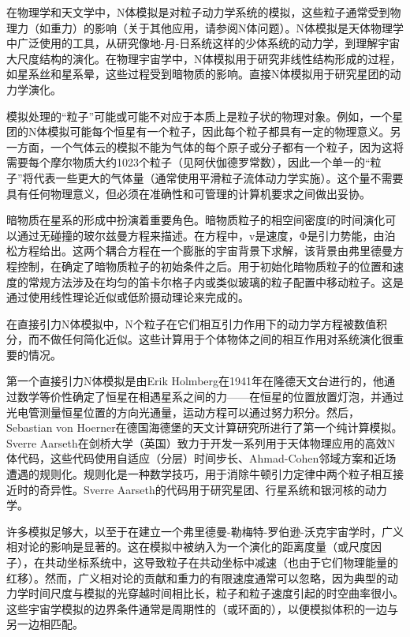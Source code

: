 
\begin{issues}
\issueDraft
\end{issues}


在物理学和天文学中，N体模拟是对粒子动力学系统的模拟，这些粒子通常受到物理力（如重力）的影响（关于其他应用，请参阅N体问题）。N体模拟是天体物理学中广泛使用的工具，从研究像地-月-日系统这样的少体系统的动力学，到理解宇宙大尺度结构的演化。在物理宇宙学中，N体模拟用于研究非线性结构形成的过程，如星系丝和星系晕，这些过程受到暗物质的影响。直接N体模拟用于研究星团的动力学演化。

模拟处理的“粒子”可能或可能不对应于本质上是粒子状的物理对象。例如，一个星团的N体模拟可能每个恒星有一个粒子，因此每个粒子都具有一定的物理意义。另一方面，一个气体云的模拟不能为气体的每个原子或分子都有一个粒子，因为这将需要每个摩尔物质大约1023个粒子（见阿伏伽德罗常数），因此一个单一的“粒子”将代表一些更大的气体量（通常使用平滑粒子流体动力学实施）。这个量不需要具有任何物理意义，但必须在准确性和可管理的计算机要求之间做出妥协。

暗物质在星系的形成中扮演着重要角色。暗物质粒子的相空间密度f的时间演化可以通过无碰撞的玻尔兹曼方程来描述。在方程中，v是速度，Φ是引力势能，由泊松方程给出。这两个耦合方程在一个膨胀的宇宙背景下求解，该背景由弗里德曼方程控制，在确定了暗物质粒子的初始条件之后。用于初始化暗物质粒子的位置和速度的常规方法涉及在均匀的笛卡尔格子内或类似玻璃的粒子配置中移动粒子。这是通过使用线性理论近似或低阶摄动理论来完成的。

在直接引力N体模拟中，N个粒子在它们相互引力作用下的动力学方程被数值积分，而不做任何简化近似。这些计算用于个体物体之间的相互作用对系统演化很重要的情况。

第一个直接引力N体模拟是由Erik Holmberg在1941年在隆德天文台进行的，他通过数学等价性确定了恒星在相遇星系之间的力——在恒星的位置放置灯泡，并通过光电管测量恒星位置的方向光通量，运动方程可以通过努力积分。然后，Sebastian von Hoerner在德国海德堡的天文计算研究所进行了第一个纯计算模拟。Sverre Aarseth在剑桥大学（英国）致力于开发一系列用于天体物理应用的高效N体代码，这些代码使用自适应（分层）时间步长、Ahmad-Cohen邻域方案和近场遭遇的规则化。规则化是一种数学技巧，用于消除牛顿引力定律中两个粒子相互接近时的奇异性。Sverre Aarseth的代码用于研究星团、行星系统和银河核的动力学。

许多模拟足够大，以至于在建立一个弗里德曼-勒梅特-罗伯逊-沃克宇宙学时，广义相对论的影响是显著的。这在模拟中被纳入为一个演化的距离度量（或尺度因子），在共动坐标系统中，这导致粒子在共动坐标中减速（也由于它们物理能量的红移）。然而，广义相对论的贡献和重力的有限速度通常可以忽略，因为典型的动力学时间尺度与模拟的光穿越时间相比长，粒子和粒子速度引起的时空曲率很小。这些宇宙学模拟的边界条件通常是周期性的（或环面的），以便模拟体积的一边与另一边相匹配。

